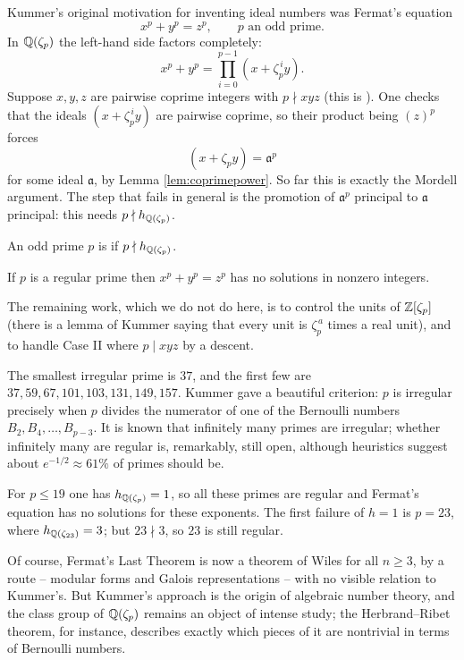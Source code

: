 \documentclass[a4paper]{scrartcl}
\newcommand{\fa}{\mathfrak{a}}
\begin{document}
Kummer's original motivation for inventing ideal numbers was Fermat's equation
$$x^p+y^p = z^p, \qquad p \text{ an odd prime}.$$
In $\mathbb{Q}(\zeta_p)$ the left-hand side factors completely:
$$x^p+y^p = \prod_{i=0}^{p-1}\left(x+\zeta_p^{\,i}y\right).$$
Suppose $x,y,z$ are pairwise coprime integers with $p \nmid xyz$ (this is ). One checks that the ideals $(x+\zeta_p^{\,i}y)$ are pairwise coprime, so their product being $(z)^p$ forces
$$\left(x+\zeta_py\right) = \fa^p$$
for some ideal $\fa$, by Lemma \ref{lem:coprimepower}. So far this is exactly the Mordell argument. The step that fails in general is the promotion of $\fa^p$ principal to $\fa$ principal: this needs $p \nmid h_{\mathbb{Q}(\zeta_p)}$.

\begin{definition}
	An odd prime $p$ is  if $p \nmid h_{\mathbb{Q}(\zeta_p)}$.
\end{definition}

\begin{theorem}[Kummer]
	If $p$ is a regular prime then $x^p+y^p = z^p$ has no solutions in nonzero integers.
\end{theorem}

The remaining work, which we do not do here, is to control the units of $\mathbb{Z}[\zeta_p]$ (there is a lemma of Kummer saying that every unit is $\zeta_p^{\,a}$ times a real unit), and to handle Case II where $p \mid xyz$ by a descent.

The smallest irregular prime is $37$, and the first few are $37, 59, 67, 101, 103, 131, 149, 157$. Kummer gave a beautiful criterion: $p$ is irregular precisely when $p$ divides the numerator of one of the Bernoulli numbers $B_2, B_4, \dots, B_{p-3}$. It is known that infinitely many primes are irregular; whether infinitely many are regular is, remarkably, still open, although heuristics suggest about $e^{-1/2} \approx 61\%$ of primes should be.

\begin{example}
	For $p \le 19$ one has $h_{\mathbb{Q}(\zeta_p)} = 1$, so all these primes are regular and Fermat's equation has no solutions for these exponents. The first failure of $h = 1$ is $p = 23$, where $h_{\mathbb{Q}(\zeta_{23})} = 3$; but $23 \nmid 3$, so $23$ is still regular.
\end{example}

\begin{remark}
	Of course, Fermat's Last Theorem is now a theorem of Wiles for all $n \geq 3$, by a route -- modular forms and Galois representations -- with no visible relation to Kummer's. But Kummer's approach is the origin of algebraic number theory, and the class group of $\mathbb{Q}(\zeta_p)$ remains an object of intense study; the Herbrand--Ribet theorem, for instance, describes exactly which pieces of it are nontrivial in terms of Bernoulli numbers.
\end{remark}
\end{document}

